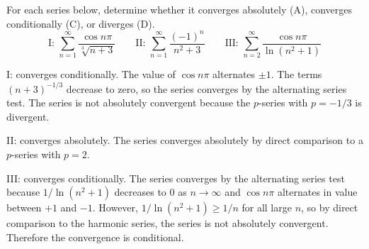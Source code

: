 \documentclass{ximera}
\begin{document}
\begin{question}%

For each series below, determine whether it converges absolutely (A), converges conditionally (C), or diverges (D).  \[\text{I: } \sum_{n = 1}^\infty\frac{\cos n \pi}{\sqrt[3]{n+3}} \qquad \text{II: } \sum_{n = 1}^\infty\frac{(-1)^n}{n^2+3} \qquad \text{III: } \sum_{n = 2}^\infty\frac{\cos n \pi}{\ln (n^2 + 1)}\]
\begin{multiplechoice}
\end{multiplechoice}
\begin{feedback}
I: converges conditionally. The value of \(\cos n \pi\) alternates \(\pm 1\). The terms \((n+3)^{-1/3}\) decrease to zero, so the series converges by the alternating series test. The series is not absolutely convergent because the \(p\)-series with \(p = -1/3\) is divergent.

II: converges absolutely. The series converges absolutely by direct comparison to a \(p\)-series with \(p=2\).

III: converges conditionally. The series converges by the alternating series test because \(1/\ln (n^2+1)\) decreases to \(0\) as \(n \rightarrow \infty\) and \(\cos n \pi\) alternates in value between \(+1\) and \(-1\). However, \(1/\ln (n^2+1) \geq 1/n\) for all large \(n\), so by direct comparison to the harmonic series, the series is not absolutely convergent. Therefore the convergence is conditional.
\end{feedback}

\end{question}
\end{document}
